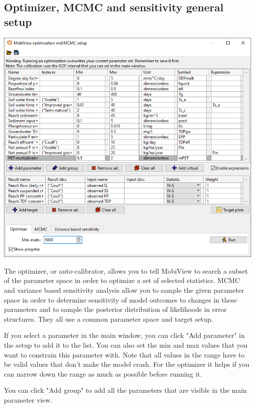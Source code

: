 \documentclass[11pt]{article}
\theoremstyle{definition}
\begin{document}
\subsection{Optimizer, MCMC and sensitivity general setup}
\begin{center}
\includegraphics[width=\linewidth]{img/mobiview_optimizer}
\end{center}

The optimizer, or auto-calibrator, allows you to tell MobiView to search a subset of the parameter space in order to optimize a set of selected statistics. MCMC and variance based sensitivity analysis allow you to sample the given parameter space in order to determine sensitivity of model outcomes to changes in these parameters and to sample the posterior distribution of likelihoods in error structures. They all use a common parameter space and target setup.

If you select a parameter in the main window, you can click "Add parameter" in the setup to add it to the list. You can also set the min and max values that you want to constrain this parameter with. Note that all values in the range have to be valid values that don't make the model crash. For the optimizer it helps if you can narrow down the range as much as possible before running it.

You can click "Add group" to add all the parameters that are visible in the main parameter view.
\end{document}
